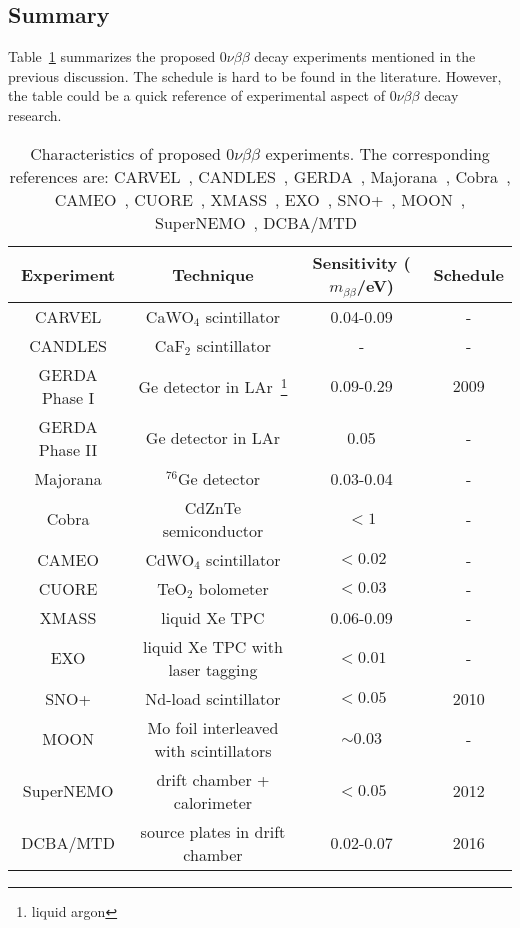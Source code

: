 \subsection{Summary}
\label{sec:exp:comp}
Table~\ref{tab:gerda:comp} summarizes the proposed $0\nu\beta\beta$ decay experiments mentioned in the previous discussion. The schedule is hard to be found in the literature. However, the table could be a quick reference of experimental aspect of $0\nu\beta\beta$ decay research.

\begin{table}[htbp]
  \centering
  \caption{Characteristics of proposed $0\nu\beta\beta$ experiments.                         The corresponding references are: CARVEL~\cite{Zde05},     CANDLES~\cite{Ume06}, GERDA~\cite{Sch05,Cal06}, Majorana~\cite{Aal04},     Cobra~\cite{Kie03}, CAMEO~\cite{Bel01}, CUORE~\cite{Ard05},     XMASS~\cite{Nak02}, EXO~\cite{Dan00}, SNO+~\cite{Zub07},             MOON~\cite{Nak06}, SuperNEMO~\cite{Sne08}, DCBA/MTD~\cite{Ish07}}
  \label{tab:gerda:comp}
  \begin{minipage}{\linewidth}
    \begin{tabular}{cccc} \hline Experiment & Technique & Sensitivity       ($m_{\beta\beta}$/eV) & Schedule \\\hline
      CARVEL & CaWO$_{4}$  scintillator & 0.04-0.09 & - \\
      CANDLES & CaF$_{2}$ scintillator & - & - \\
      GERDA Phase I & Ge detector in LAr~\footnote{liquid argon} &       0.09-0.29 & 2009 \\
      GERDA Phase II & Ge detector in LAr & 0.05 & - \\
      Majorana & $^{76}$Ge detector & 0.03-0.04 & - \\
      Cobra & CdZnTe semiconductor & $< 1$ & - \\
      CAMEO & CdWO$_{4}$ scintillator & $< 0.02$ & - \\
      CUORE & TeO$_{2}$ bolometer & $< 0.03$ & - \\
      XMASS & liquid Xe TPC & 0.06-0.09 & - \\
      EXO & liquid Xe TPC with laser tagging & $< 0.01$ & - \\
      SNO+ & Nd-load scintillator & $< 0.05$ & 2010 \\ 
      MOON & Mo foil interleaved with scintillators & $\sim0.03$ & -\\
      SuperNEMO & drift chamber + calorimeter & $< 0.05$ & 2012 \\
      DCBA/MTD & source plates in drift chamber & 0.02-0.07 & 2016 \\
    \end{tabular}
  \end{minipage}
\end{table}

